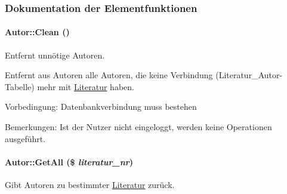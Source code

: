 \subsubsection{Dokumentation der Elementfunktionen}
\hypertarget{classAutor_77b27af7e471abe5a404fc92c7319921}{
\paragraph[Clean]{\setlength{\rightskip}{0pt plus 5cm}Autor::Clean ()}\hfill}
\label{classAutor_77b27af7e471abe5a404fc92c7319921}


Entfernt unnötige Autoren. 

Entfernt aus Autoren alle Autoren, die keine Verbindung (Literatur\_\-Autor-Tabelle) mehr mit \hyperlink{classLiteratur}{Literatur} haben. \begin{Desc}
\item[Vorbedingung:]Datenbankverbindung muss bestehen \end{Desc}
\begin{Desc}
\item[Bemerkungen:]Ist der Nutzer nicht eingeloggt, werden keine Operationen ausgeführt. \end{Desc}
\hypertarget{classAutor_79cd90084cab240919a5daecf39156a7}{
\paragraph[GetAll]{\setlength{\rightskip}{0pt plus 5cm}Autor::Get\-All (\$ {\em literatur\_\-nr})}\hfill}
\label{classAutor_79cd90084cab240919a5daecf39156a7}


Gibt Autoren zu bestimmter \hyperlink{classLiteratur}{Literatur} zurück. 

